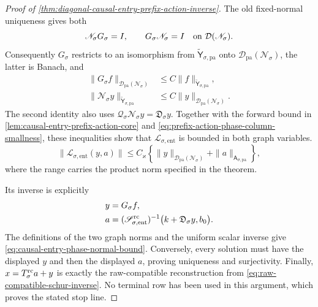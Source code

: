 \begin{proof}[Proof of
\cref{thm:diagonal-causal-entry-prefix-action-inverse}]
The old fixed-normal uniqueness gives both
\[
 \mathscr N_\sigma G_\sigma=I,\qquad
 G_\sigma\mathscr N_\sigma=I
       \quad\hbox{on }\mathcal D(\mathscr N_\sigma).
\]
Consequently \(G_\sigma\) restricts to an isomorphism from
\(\widetilde{\mathsf Y}_{\sigma,\mathrm{pa}}\) onto
\(\mathcal D_{\mathrm{pa}}(\mathscr N_\sigma)\), the latter is Banach, and
\begin{align*}
 \|G_\sigma f\|_{\mathcal D_{\mathrm{pa}}(\mathscr N_\sigma)}
 &\le C\|f\|_{\widetilde{\mathsf Y}_{\sigma,\mathrm{pa}}},\\
 \|\mathscr N_\sigma y\|_{\widetilde{\mathsf Y}_{\sigma,\mathrm{pa}}}
 &\le C\|y\|_{\mathcal D_{\mathrm{pa}}(\mathscr N_\sigma)}.
\end{align*}
The second identity also uses
\(\mathscr Q_\sigma\mathscr N_\sigma y=\mathfrak D_\sigma y\).
Together with the forward bound in
\cref{lem:causal-entry-prefix-action-core} and
\cref{eq:prefix-action-phase-column-smallness}, these inequalities show
that \(\mathscr L_{\sigma,\mathrm{ent}}\) is bounded in both graph
variables.
\begin{equation}
 \|\mathscr L_{\sigma,\mathrm{ent}}(y,a)\|
 \le C_\varkappa\left\{
   \|y\|_{\mathcal D_{\mathrm{pa}}(\mathscr N_\sigma)}
      +\|a\|_{\mathsf A_{\sigma,\mathrm{pa}}}\right\},       \label{eq:proof-causal-entry-forward-bound}
\end{equation}
where the range carries the product norm specified in the theorem.

Its inverse is explicitly
\begin{align}
 y&=G_\sigma f,\\
 a&=(\mathscr S_{\sigma,\mathrm{ent}}^{\rm rc})^{-1}
       \bigl(k+\mathfrak D_\sigma y,b_0\bigr).   \label{eq:proof-causal-entry-phase-normal-inverse}
\end{align}
The definitions of the two graph norms and the uniform scalar inverse give
\cref{eq:causal-entry-phase-normal-bound}.  Conversely, every solution
must have the displayed \(y\) and then the displayed \(a\), proving
uniqueness and surjectivity.  Finally,
\(x=T_\sigma^{\rm rc}a+y\) is exactly the raw-compatible reconstruction
from \cref{eq:raw-compatible-schur-inverse}.  No terminal row has been
used in this argument, which proves the stated stop line.
\end{proof}

